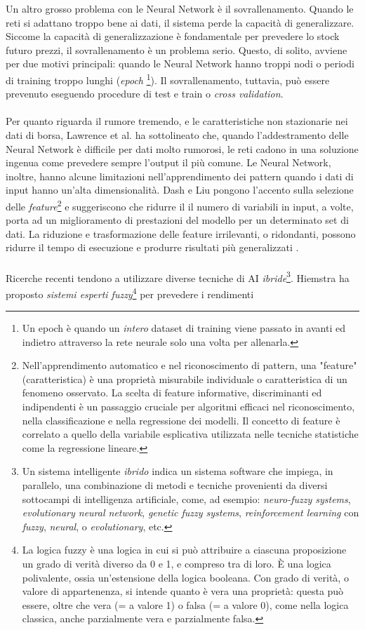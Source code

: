 \documentclass[a4paper,12pt]{report}
\begin{document}
Un altro grosso problema con le Neural Network è il sovrallenamento. Quando le reti si adattano troppo bene ai dati, il sistema perde la capacità di generalizzare. Siccome la capacità di generalizzazione è fondamentale per prevedere lo stock futuro prezzi, il sovrallenamento è un problema serio. Questo, di solito, avviene per due motivi principali: quando le Neural Network hanno troppi nodi o periodi di training troppo lunghi (\textit{epoch} \footnote{Un epoch è quando un \textit{intero} dataset di training viene passato in avanti ed indietro attraverso la rete neurale solo una volta per allenarla.}). Il sovrallenamento, tuttavia, può essere prevenuto eseguendo procedure di test e train o \textit{cross validation}.\\~\\Per quanto riguarda il rumore tremendo, e le caratteristiche non stazionarie nei dati di borsa, Lawrence et al. \cite{nn1} ha sottolineato che, quando l'addestramento delle Neural Network è difficile per dati molto rumorosi, le reti cadono in una soluzione ingenua come prevedere sempre l'output il più comune. Le Neural Network, inoltre, hanno alcune limitazioni nell'apprendimento dei pattern quando i dati di input hanno un'alta dimensionalità. Dash e Liu \cite{2} pongono l'accento sulla selezione delle \textit{feature}\footnote{Nell'apprendimento automatico e nel riconoscimento di pattern, una "feature" (caratteristica) è una proprietà misurabile individuale o caratteristica di un fenomeno osservato. La scelta di feature informative, discriminanti ed indipendenti è un passaggio cruciale per algoritmi efficaci nel riconoscimento, nella classificazione e nella regressione dei modelli. Il concetto di feature è correlato a quello della variabile esplicativa utilizzata nelle tecniche statistiche come la regressione lineare.} e suggeriscono che ridurre il il numero di variabili in input, a volte, porta ad un miglioramento di prestazioni del modello per un determinato set di dati. La riduzione e trasformazione delle feature irrilevanti, o ridondanti, possono ridurre il tempo di esecuzione e produrre risultati più generalizzati \cite{2}.\\~\\ Ricerche recenti tendono a utilizzare diverse tecniche di AI \textit{ibride}\footnote{Un sistema intelligente \textit{ibrido} indica un sistema software che impiega, in parallelo, una combinazione di metodi e tecniche provenienti da diversi sottocampi di intelligenza artificiale, come, ad esempio: \textit{neuro-fuzzy systems}, \textit{evolutionary neural network}, \textit{genetic fuzzy systems}, \textit{reinforcement learning} con \textit{fuzzy}, \textit{neural}, o \textit{evolutionary}, etc.}. Hiemstra \cite{11} ha proposto \textit{sistemi esperti fuzzy}\footnote{La logica fuzzy è una logica in cui si può attribuire a ciascuna proposizione un grado di verità diverso da 0 e 1, e compreso tra di loro. È una logica polivalente, ossia un'estensione della logica booleana. Con grado di verità, o valore di appartenenza, si intende quanto è vera una proprietà: questa può essere, oltre che vera (= a valore 1) o falsa (= a valore 0), come nella logica classica, anche parzialmente vera e parzialmente falsa.} per prevedere i rendimenti 
\end{document}
